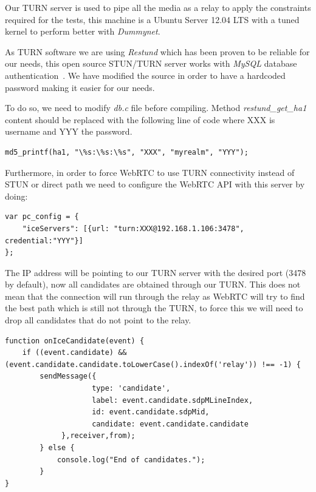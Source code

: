 Our TURN server is used to pipe all the media as a relay to apply the constraints required for the tests, this machine is a Ubuntu Server 12.04 LTS with a tuned kernel to perform better with {\it Dummynet}.

As TURN software we are using {\it Restund} which has been proven to be reliable for our needs, this open source STUN/TURN server works with {\it MySQL} database authentication~\cite{restund}. We have modified the source in order to have a hardcoded password making it easier for our needs.

To do so, we need to modify {\it db.c} file before compiling. Method {\it restund\_get\_ha1} content should be replaced with the following line of code where XXX is username and YYY the password.

\lstset{language=C}
\begin{lstlisting}[caption=Forcing a hardcoded password in our TURN server]
md5_printf(ha1, "\%s:\%s:\%s", "XXX", "myrealm", "YYY");
\end{lstlisting}

Furthermore, in order to force WebRTC to use TURN connectivity instead of STUN or direct path we need to configure the WebRTC API with this server by doing:

\lstset{language=JavaScript}
\begin{lstlisting}[caption=Configuring our TURN server in WebRTC]
var pc_config = {
	"iceServers": [{url: "turn:XXX@192.168.1.106:3478", credential:"YYY"}]
};
\end{lstlisting}

The IP address will be pointing to our TURN server with the desired port (3478 by default), now all candidates are obtained through our TURN. This does not mean that the connection will run through the relay as WebRTC will try to find the best path which is still not through the TURN, to force this we will need to drop all candidates that do not point to the relay.

\lstset{language=JavaScript}
\begin{lstlisting}[caption=Dropping all candidates except relay]
function onIceCandidate(event) {
	if ((event.candidate) && (event.candidate.candidate.toLowerCase().indexOf('relay')) !== -1) {
		sendMessage({
               		type: 'candidate',
               		label: event.candidate.sdpMLineIndex,
               		id: event.candidate.sdpMid,
               		candidate: event.candidate.candidate
          	 },receiver,from);
       	} else {
           	console.log("End of candidates.");
       	}
}
\end{lstlisting}

